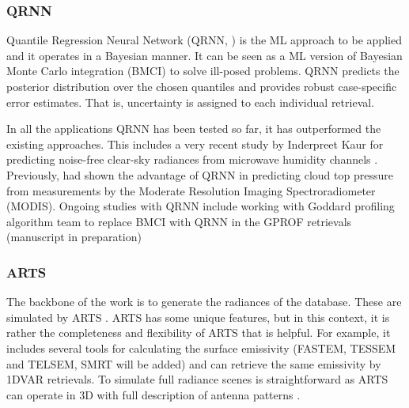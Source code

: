 \documentclass[12pt,oneside,a4paper]{article}
\begin{document}
\subsubsection{QRNN}
%
\label{sec:qrnn}

Quantile Regression Neural Network (QRNN, \citet{pfreundschuh:aneur:18}) is the
ML approach to be applied and it operates in a Bayesian manner. It can be seen
as a ML version of Bayesian Monte Carlo integration (BMCI) to solve ill-posed
problems. QRNN predicts the posterior distribution over the chosen quantiles
and provides robust case-specific error estimates. That is, uncertainty is
assigned to each individual retrieval.


In all the applications QRNN has been tested so far, it has outperformed the
existing approaches. This includes a very recent study by Inderpreet Kaur for
predicting noise-free clear-sky radiances from microwave humidity channels
\citep{kaur:2021:canma}. Previously, \citet{pfreundschuh:aneur:18} had shown
the advantage of QRNN in predicting cloud top pressure from measurements by the
Moderate Resolution Imaging Spectroradiometer (MODIS). Ongoing studies with
QRNN include working with Goddard profiling algorithm \citep[GPROF,][]
{kummerow:2015:thevo} team to replace BMCI with QRNN in the GPROF retrievals
(manuscript in preparation)


\subsubsection{ARTS}
\label{sec:arts}
% 
The backbone of the work is to generate the radiances of the database. These
are simulated by ARTS \citep[Atmospheric Radiative Transfer Simulator,][]
{eriksson:arts2:11}. ARTS has some unique features, but in this context,
it is rather the completeness and flexibility of ARTS that is helpful. For
example, it includes several tools for calculating the surface emissivity
(FASTEM, TESSEM and TELSEM, SMRT will be added) and can retrieve the same
emissivity by 1DVAR retrievals. To simulate full radiance scenes is
straightforward as ARTS can operate in 3D with full description of antenna
patterns \citep{duncan:anexp:19}.
\end{document}

